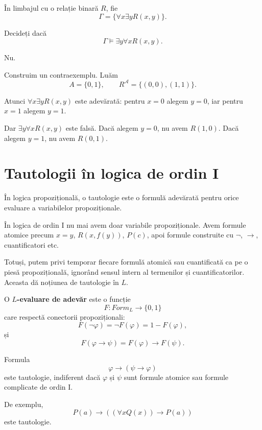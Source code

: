 \begin{ex}
	În limbajul cu o relație binară \(R\), fie
	\[
		\Gamma = \{\forall x \exists y R(x,y)\}.
	\]

	Decideți dacă
	\[
		\Gamma \models \exists y \forall x R(x,y).
	\]
\end{ex}

\begin{solutie}
	Nu.

	Construim un contraexemplu. Luăm
	\[
		A=\{0,1\}, \qquad R^\mathcal{A}=\{(0,0),(1,1)\}.
	\]

	Atunci \( \forall x \exists y R(x,y) \) este adevărată: pentru \(x=0\) alegem \(y=0\), iar pentru \(x=1\) alegem \(y=1\).

	Dar \( \exists y \forall x R(x,y) \) este falsă. Dacă alegem \(y=0\), nu avem \(R(1,0)\). Dacă alegem \(y=1\), nu avem \(R(0,1)\).
\end{solutie}

\section{Tautologii în logica de ordin I}

În logica propozițională, o tautologie este o formulă adevărată pentru orice evaluare a variabilelor propoziționale.

În logica de ordin I nu mai avem doar variabile propoziționale. Avem formule atomice precum \(x=y\), \(R(x,f(y))\), \(P(c)\), apoi formule construite cu \( \neg \), \( \to \), cuantificatori etc.

Totuși, putem privi temporar fiecare formulă atomică sau cuantificată ca pe o piesă propozițională, ignorând sensul intern al termenilor și cuantificatorilor. Aceasta dă noțiunea de tautologie în \(L\).

\begin{definition}
	O \textbf{\(L\)-evaluare de adevăr} este o funcție
	\[
		F : Form_L \to \{0,1\}
	\]
	care respectă conectorii propoziționali:
	\[
		F(\neg \varphi)= \neg F(\varphi) = 1-F(\varphi),
	\]
	și
	\[
		F(\varphi \to \psi)=F(\varphi)\to F(\psi).
	\]
\end{definition}


\begin{eg}
	Formula
	\[
		\varphi \to (\psi \to \varphi)
	\]
	este tautologie, indiferent dacă \( \varphi \) și \( \psi \) sunt formule atomice sau formule complicate de ordin I.

	De exemplu,
	\[
		P(a) \to ((\forall x Q(x)) \to P(a))
	\]
	este tautologie.
\end{eg}

